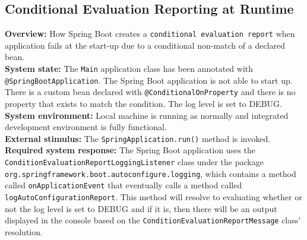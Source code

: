 \subsection*{Conditional Evaluation Reporting at Runtime}

\textbf{Overview:} How Spring Boot creates a \texttt{conditional evaluation report} when application fails at the start-up due to a conditional non-match of a declared bean.\\

\textbf{System state:} The \texttt{Main} application class has been annotated with \texttt{@SpringBootApplication}. The Spring Boot application is not able to start up. There is a custom bean declared with \texttt{@ConditionalOnProperty} and there is no property that exists to match the condition. The log level is set to DEBUG. \\

\textbf{System environment:} Local machine is running as normally and integrated development environment is fully functional. \\

\textbf{External stimulus:} The \texttt{SpringApplication.run()} method is invoked. \\

\textbf{Required system response:} The Spring Boot application uses the \texttt{ConditionEvaluationReportLoggingListener} class under the package\\ \texttt{org.springframework.boot.autoconfigure.logging}, which contains a method called \texttt{onApplicationEvent} that eventually calls a method called \texttt{logAutoConfigurationReport}. This method will resolve to evaluating whether or not the log level is set to DEBUG and if it is, then there will be an output displayed in the console based on the \texttt{ConditionEvaluationReportMessage} class' resolution. 
